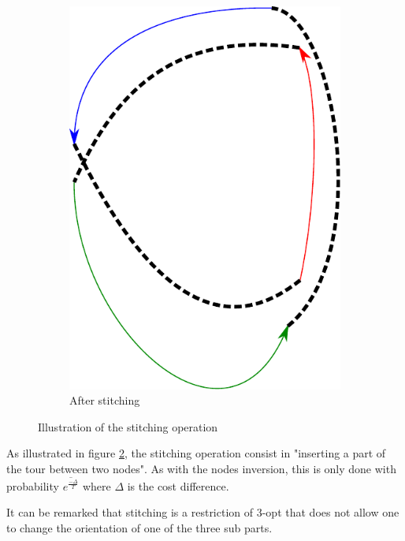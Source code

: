 \documentclass[fontsize=9pt,twocolumns,enabledeprecatedfontcommands]{scrartcl}
\begin{document}
\begin{figure}[htbp]
\begin{subfigure}{0.4\textwidth}
		\centering
		\includegraphics[angle=90,width=\linewidth,height=0.15\textheight]{stitch2}
		\caption{After stitching}
		\label{stitch2}
		
	\end{subfigure}
	\captionsetup{format=plain}
	\caption{Illustration of the stitching operation}
	\label{stitch_fig}
\end{figure}

As illustrated in figure \ref{stitch_fig}, the stitching operation consist in "inserting a part of the tour between two nodes". As with the nodes inversion, this is only done with probability $\overline{e^{\frac{-\Delta}{T}}}$ where $\Delta$ is the cost difference.

It can be remarked that stitching is a restriction of 3-opt that does not allow one to change the orientation of one of the three sub parts.
\end{document}
